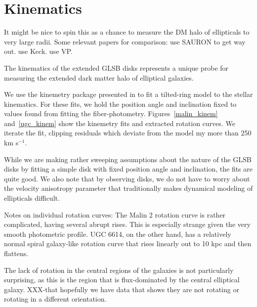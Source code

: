 \documentclass[12pt,preprint]{aastex}
\def\arcsec{$^{\prime\prime}$}
\newcommand\kms{km s$^{-1}$}
\begin{document}
\section{Kinematics}



It might be nice to spin this as a chance to measure the DM halo of ellipticals to very large radii.  Some relevant papers for comparison:
\citet{Weij09} use SAURON to get way out.  \citet{Proctor09} use Keck.  \citet{Murphy2011} use VP.


The kinematics of the extended GLSB disks represents a unique probe for measuring the extended dark matter halo of elliptical galaxies.  

We use the kinemetry package presented in \citet{Krajn06} to fit a tilted-ring model to the stellar kinematics.  For these fits, we hold the position angle and inclination fixed to values found from fitting the fiber-photometry.  Figures~\ref{malin_kinem} and~\ref{ugc_kinem} show the kinemetry fits and extracted rotation curves.  We iterate the fit, clipping residuals which deviate from the model my more than 250 \kms.  

While we are making rather sweeping assumptions about the nature of the GLSB disks by fitting a simple disk with fixed position angle and inclination, the fits are quite good.  We also note that by observing disks, we do not have to worry about the velocity anisotropy parameter that traditionally makes dynamical modeling of ellipticals difficult.

Notes on individual rotation curves:
The Malin 2 rotation curve is rather complicated, having several abrupt rises.  This is especially strange given the very smooth photometric profile.  UGC 6614, on the other hand, has a relatively normal spiral galaxy-like rotation curve that rises linearly out to 10 kpc and then flattens.  

The lack of rotation in the central regions of the galaxies is not particularly surprising, as this is the region that is flux-dominated by the central elliptical galaxy.  XXX-that hopefully we have data that shows they are not rotating or rotating in a different orientation.
\end{document}
